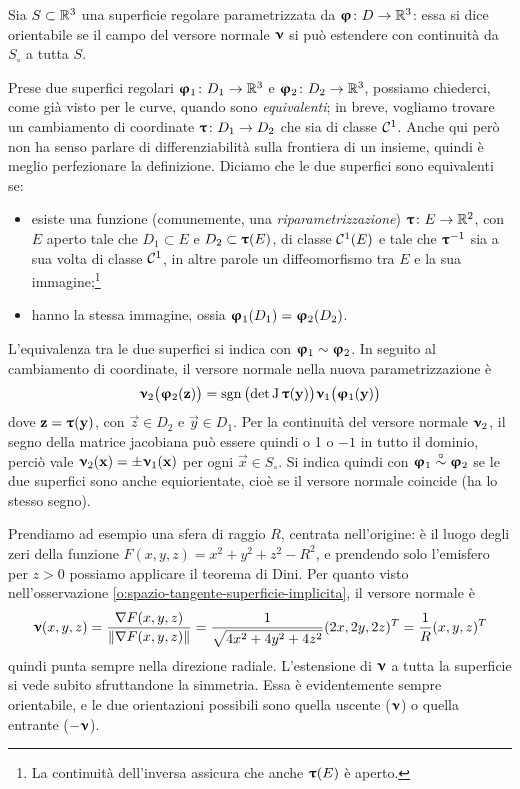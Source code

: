 \begin{definizione} \label{d:superficie-orientabile}
	Sia $S\subset\mathbb{R}^3$ una superficie regolare parametrizzata da $\bm{\upvarphi}\colon D\to\mathbb{R}^3$: essa si dice orientabile se il campo del versore normale $\bm{\upnu}$ si può estendere con continuità da $S_\circ$ a tutta $S$.
\end{definizione}
Prese due superfici regolari $\bm{\upvarphi}_1\colon D_1\to\mathbb{R}^3$ e $\bm{\upvarphi}_2\colon D_2\to\mathbb{R}^3$, possiamo chiederci, come già visto per le curve, quando sono \emph{equivalenti}; in breve, vogliamo trovare un cambiamento di coordinate $\bm{\uptau}\colon D_1\to D_2$ che sia di classe $\mathcal{C}^{{1}}$.
Anche qui però non ha senso parlare di differenziabilità sulla frontiera di un insieme, quindi è meglio perfezionare la definizione.
Diciamo che le due superfici sono equivalenti se:
\begin{itemize}
	\item esiste una funzione (comunemente, una \emph{riparametrizzazione}) $\bm{\uptau}\colon E\to\mathbb{R}^2$, con $E$ aperto tale che $D_1\subset E$ e $D_2\subset\bm{\uptau}(E)$, di classe $\mathcal{C}^{{1}}(E)$ e tale che $\bm{\uptau}^{-1}$ sia a sua volta di classe $\mathcal{C}^{{1}}$, in altre parole un diffeomorfismo tra $E$ e la sua immagine;\footnote{
		La continuità dell'inversa assicura che anche $\bm{\uptau}(E)$ è aperto.
	}
	\item hanno la stessa immagine, ossia $\bm{\upvarphi}_1(D_1)=\bm{\upvarphi}_2(D_2)$. 
\end{itemize}
L'equivalenza tra le due superfici si indica con $\bm{\upvarphi}_1\sim\bm{\upvarphi}_2$.
In seguito al cambiamento di coordinate, il versore normale nella nuova parametrizzazione è
\begin{equation}
	\bm{\upnu}_2\big(\bm{\upvarphi}_2(\mathbf{z})\big)=\operatorname{sgn}\big(\!\det\operatorname{J}\bm{\uptau}(\mathbf{y})\big)\bm{\upnu}_1\big(\bm{\upvarphi}_1(\mathbf{y})\big)
\end{equation}
dove $\mathbf{z}=\bm{\uptau}(\mathbf{y})$, con $\vec z\in D_2$ e $\vec y\in D_1$.
Per la continuità del versore normale $\bm{\upnu}_2$, il segno della matrice jacobiana può essere quindi o 1 o $-1$ in tutto il dominio, perciò vale $\bm{\upnu}_2(\mathbf{x})=\pm\bm{\upnu}_1(\mathbf{x})$ per ogni $\vec x\in S_\circ$.
Si indica quindi con $\bm{\upvarphi}_1\overset{\circ}{\sim}\bm{\upvarphi}_2$ se le due superfici sono anche equiorientate, cioè se il versore normale coincide (ha lo stesso segno).

Prendiamo ad esempio una sfera di raggio $R$, centrata nell'origine: è il luogo degli zeri della funzione $F(x,y,z)=x^2+y^2+z^2-R^2$, e prendendo solo l'emisfero per $z>0$ possiamo applicare il teorema di Dini.
Per quanto visto nell'osservazione \ref{o:spazio-tangente-superficie-implicita}, il versore normale è
\begin{equation}
	\bm{\upnu}(x,y,z)=\frac{\nabla F(x,y,z)}{\left\|{\nabla F(x,y,z)}\right\|}=\frac1{\sqrt{4x^2+4y^2+4z^2}}(2x,2y,2z)^T=\frac1{R}(x,y,z)^T
\end{equation}
quindi punta sempre nella direzione radiale.
L'estensione di $\bm{\upnu}$ a tutta la superficie si vede subito sfruttandone la simmetria.
Essa è evidentemente sempre orientabile, e le due orientazioni possibili sono quella uscente ($\bm{\upnu}$) o quella entrante ($-\bm{\upnu}$).

